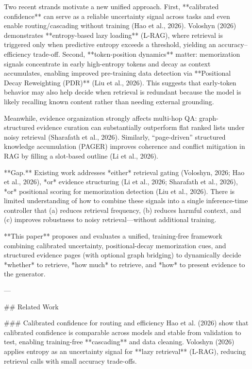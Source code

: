 Two recent strands motivate a new unified approach. First, **calibrated confidence** can serve as a reliable uncertainty signal across tasks and even enable routing/cascading without training (Hao et al., 2026). Voloshyn (2026) demonstrates **entropy-based lazy loading** (L-RAG), where retrieval is triggered only when predictive entropy exceeds a threshold, yielding an accuracy–efficiency trade-off. Second, **token-position dynamics** matter: memorization signals concentrate in early high-entropy tokens and decay as context accumulates, enabling improved pre-training data detection via **Positional Decay Reweighting (PDR)** (Liu et al., 2026). This suggests that early-token behavior may also help decide when retrieval is redundant because the model is likely recalling known content rather than needing external grounding.  

Meanwhile, evidence organization strongly affects multi-hop QA: graph-structured evidence curation can substantially outperform flat ranked lists under noisy retrieval (Sharafath et al., 2026). Similarly, “page-driven” structured knowledge accumulation (PAGER) improves coherence and conflict mitigation in RAG by filling a slot-based outline (Li et al., 2026).  

**Gap.** Existing work addresses *either* retrieval gating (Voloshyn, 2026; Hao et al., 2026), *or* evidence structuring (Li et al., 2026; Sharafath et al., 2026), *or* positional scoring for memorization detection (Liu et al., 2026). There is limited understanding of how to combine these signals into a single inference-time controller that (a) reduces retrieval frequency, (b) reduces harmful context, and (c) improves robustness to noisy retrieval—without additional training.

**This paper** proposes and evaluates a unified, training-free framework combining calibrated uncertainty, positional-decay memorization cues, and structured evidence pages (with optional graph bridging) to dynamically decide *whether* to retrieve, *how much* to retrieve, and *how* to present evidence to the generator.

---

## Related Work  

### Calibrated confidence for routing and efficiency  
Hao et al. (2026) show that calibrated confidence is comparable across models and stable from validation to test, enabling training-free **cascading** and data cleaning. Voloshyn (2026) applies entropy as an uncertainty signal for **lazy retrieval** (L-RAG), reducing retrieval calls with small accuracy trade-offs.

